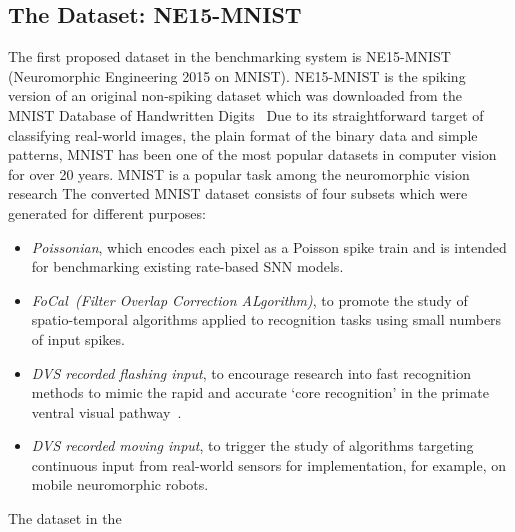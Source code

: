 \subsection{The Dataset: NE15-MNIST}
\label{sec:data}
The first proposed dataset in the benchmarking system is NE15-MNIST (Neuromorphic Engineering 2015 on MNIST).
NE15-MNIST is the spiking version of an original non-spiking dataset which was downloaded from the MNIST Database of Handwritten Digits~\citep{lecun1998gradient}  \protect{}  \protect{}
Due to its straightforward target of classifying real-world images, the plain format of the binary data and simple patterns, MNIST has been one of the most popular datasets in computer vision for over 20 years.
MNIST is a popular task among the neuromorphic vision research \protect{} \protect{}
The converted MNIST dataset consists of four subsets which were generated for different purposes:
\begin{itemize}
	\item \textit{Poissonian},
	which encodes each pixel as a Poisson spike train and is intended for benchmarking existing rate-based SNN models.
	\item \textit{FoCal~(Filter Overlap Correction ALgorithm)},
	to promote the study of spatio-temporal algorithms applied to recognition tasks using small numbers of input spikes.
	\item \textit{DVS recorded flashing input},
	to encourage research into fast recognition methods to mimic the rapid and accurate `core recognition' in the primate ventral visual pathway~\citep{dicarlo2012does}.
	\item \textit{DVS recorded moving input},
	to trigger the study of algorithms targeting continuous input from real-world sensors for implementation, for example, on mobile neuromorphic robots.
\end{itemize}
The dataset \protect{} \protect{} in the \protect{} \protect{}
